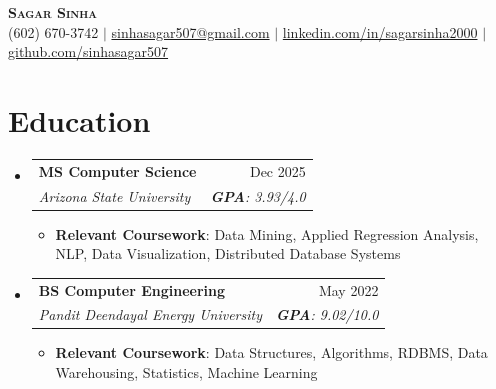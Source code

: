 \documentclass[letterpaper,9pt]{article}
\makeatletter
\newcommand{\resumeItem}[1]{
  \item\small{
    {#1 \vspace{-2pt}}
  }
}
\newcommand{\resumeSubheading}[4]{
  \vspace{-2pt}\item
    \begin{tabular*}{0.97\textwidth}[t]{l@{\extracolsep{\fill}}r}
      \textbf{#1} & {\small #2} \\
      \textit{\small#3} & \textit{\small #4} \\
    \end{tabular*}\vspace{-7pt}
}
\newcommand{\resumeSubHeadingListStart}{\begin{itemize}[leftmargin=0.15in, label={}]}
\newcommand{\resumeSubHeadingListEnd}{\end{itemize}}
\newcommand{\resumeItemListStart}{\begin{itemize}}
\newcommand{\resumeItemListEnd}{\end{itemize}\vspace{-5pt}}
\makeatother
\begin{document}
\vspace*{-10pt} 
\begin{center}
    \textbf{\Huge \scshape Sagar Sinha} \\ \vspace{4pt}
    \small (602) 670-3742 $|$
    \href{mailto:sinhasagar507@gmail.com}{sinhasagar507@gmail.com} $|$
    \href{https://linkedin.com/in/sagarsinha2000}{linkedin.com/in/sagarsinha2000} $|$
    \href{https://github.com/sinhasagar507}{github.com/sinhasagar507}
\end{center}

\section{Education}
  \resumeSubHeadingListStart
    \resumeSubheading
      {MS Computer Science}{Dec 2025}
      {Arizona State University}{\textbf{GPA}: 3.93/4.0}
      \vspace{1pt}
      \resumeItemListStart
        \resumeItem{\textbf{Relevant Coursework}: Data Mining, Applied Regression Analysis, NLP, Data Visualization, Distributed Database Systems}
      \resumeItemListEnd

    \resumeSubheading
      {BS Computer Engineering}{May 2022}
      {Pandit Deendayal Energy University}{\textbf{GPA}: 9.02/10.0}
      \vspace{1pt}
      \resumeItemListStart
        \resumeItem{\textbf{Relevant Coursework}: Data Structures, Algorithms, RDBMS, Data Warehousing, Statistics, Machine Learning}
      \resumeItemListEnd
  \resumeSubHeadingListEnd

\end{document}
